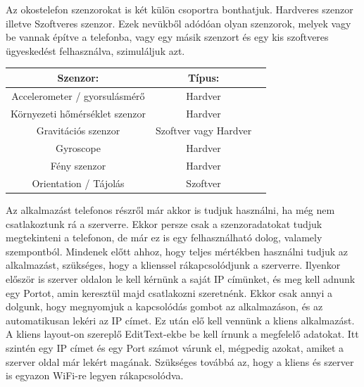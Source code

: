 \documentclass{thesis-ekf}
\theoremstyle{definition}
\theoremstyle{remark}
\begin{document}
\par Az okostelefon szenzorokat is két külön csoportra bonthatjuk. Hardveres szenzor illetve Szoftveres szenzor. Ezek nevükből adódóan olyan szenzorok, melyek vagy be vannak építve a telefonba, vagy egy másik szenzort és egy kis szoftveres ügyeskedést felhasználva, szimuláljuk azt.
\begin{center}
	\begin{tabular}{ |c|c|c| } 
		\hline
		Szenzor: & Típus: \\
		\hline\hline
		Accelerometer / gyorsulásmérő & Hardver  \\
		\hline
		Környezeti hőmérséklet szenzor & Hardver \\
		\hline
		Gravitációs szenzor & Szoftver vagy Hardver \\
		\hline
		Gyroscope & Hardver \\
		\hline
		Fény szenzor & Hardver \\
		\hline
		Orientation / Tájolás & Szoftver \\
		\hline
	\end{tabular}
\end{center}
\pagebreak
Az alkalmazást telefonos részről már akkor is tudjuk használni, ha még nem csatlakoztunk rá a szerverre. Ekkor persze csak a szenzoradatokat tudjuk megtekinteni a telefonon, de már ez is egy felhasználható dolog, valamely szempontból. Mindenek előtt ahhoz, hogy teljes mértékben használni tudjuk az alkalmazást, szükséges, hogy a klienssel rákapcsolódjunk a szerverre. Ilyenkor először is szerver oldalon le kell kérnünk a saját IP címünket, és meg kell adnunk egy Portot, amin keresztül majd csatlakozni szeretnénk. Ekkor csak annyi a dolgunk, hogy megnyomjuk a kapcsolódás gombot az alkalmazáson, és az automatikusan lekéri az IP címet. Ez után elő kell vennünk a kliens alkalmazást. A kliens layout-on szereplő EditText-ekbe be kell írnunk a megfelelő adatokat. Itt szintén egy IP címet és egy Port számot várunk el, mégpedig azokat, amiket a szerver oldal már lekért magának. Szükséges továbbá az, hogy a kliens és szerver is egyazon WiFi-re legyen rákapcsolódva.
\end{document}
